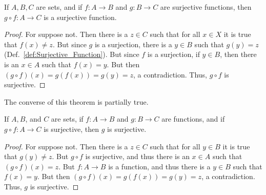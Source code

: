         \begin{theorem}
            \label{thm:Comp_of_Surj_is_Surj}%
            If $A,B,C$ are sets, and if $f:A\rightarrow{B}$ and
            $g:B\rightarrow{C}$ are surjective functions, then
            $g\circ{f}:A\rightarrow{C}$ is a surjective function.
        \end{theorem}
        \begin{proof}
            For suppose not. Then there is a $z\in{C}$ such that for all
            $x\in{X}$ it is true that $f(x)\ne{z}$. But since $g$ is a
            surjection, there is a $y\in{B}$ such that $g(y)=z$
            (Def.~\ref{def:Surjective_Function}). But since $f$ is a surjection,
            if $y\in{B}$, then there is an $x\in{A}$ such that $f(x)=y$.
            But then $(g\circ{f})(x)=g(f(x))=g(y)=z$, a contradiction.
            Thus, $g\circ{f}$ is surjective.
        \end{proof}
        The converse of this theorem is partially true.
        \begin{theorem}
            If $A,B$, and $C$ are sets, if $f:A\rightarrow{B}$ and
            $g:B\rightarrow{C}$ are functions, and if
            $g\circ{f}:A\rightarrow{C}$ is surjective, then $g$ is surjective.
        \end{theorem}
        \begin{proof}
            For suppose not. Then there is a $z\in{C}$ such that for all
            $y\in{B}$ it is true that $g(y)\ne{z}$. But $g\circ{f}$ is
            surjective, and thus there is an $x\in{A}$ such that
            $(g\circ{f})(x)=z$. But $f:A\rightarrow{B}$ is a function, and thus
            there is a $y\in{B}$ such that $f(x)=y$. But then
            $(g\circ{f})(x)=g(f(x))=g(y)=z$, a contradiction. Thus, $g$ is
            surjective.
        \end{proof}
